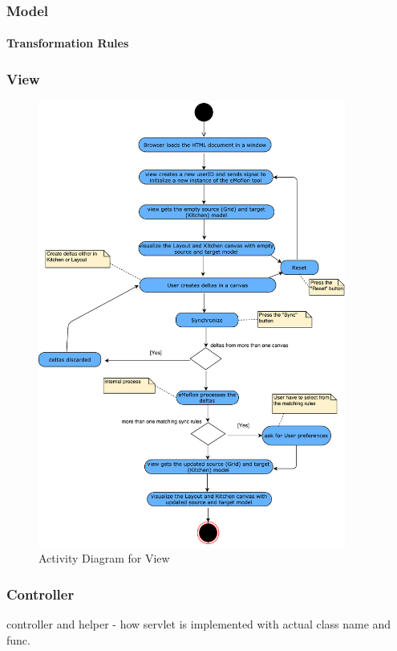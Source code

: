 \subsubsection{Model}\label{subsubsec:imple_model}
\paragraph{Transformation Rules}

\subsubsection{View}\label{subsubsec:imple_view}

\begin{figure}
	\includegraphics[width=0.9\textwidth]{figures/Activity_Diagram_View}
	\caption{Activity Diagram for View}
	\label{fig:Activity_Diagram_View}
\end{figure}

\subsubsection{Controller}\label{subsubsec:imple_controller}
controller and helper - how servlet is implemented with actual class name and func.

